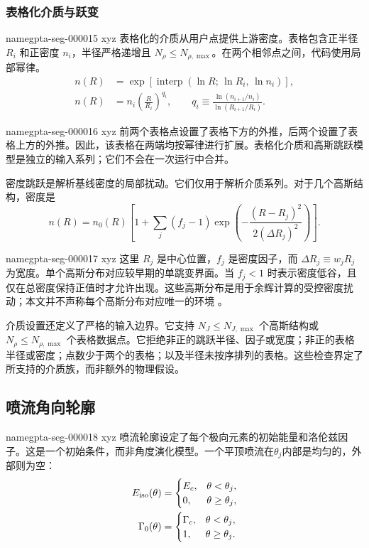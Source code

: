 \documentclass[twocolumn]{aastex702}
\makeatletter
\providecommand{\gptareaderanchor}[1]{\pdfdest name{#1} xyz}%
\providecommand{\gptareaderanchor}[1]{\special{pdf:dest (#1) [ @thispage /XYZ @xpos @ypos null ]}}%
\makeatother
\begin{document}
\subsubsection{表格化介质与跃变}


\gptareaderanchor{gpta-seg-000015}%
表格化的介质从用户点提供上游密度。表格包含正半径 \(R_i\) 和正密度 \(n_i\)，半径严格递增且 \(N_\rho\le N_{\rho,\max}\)。在两个相邻点之间，代码使用局部幂律。
\begin{equation}
\begin{aligned}
n(R) &=
\exp\left[
\operatorname{interp}\left(\ln R;\,\ln R_i,\,\ln n_i\right)
\right],\\
n(R) &=
n_i
\left(\frac{R}{R_i}\right)^{q_i},\qquad
q_i\equiv\frac{\ln(n_{i+1}/n_i)}{\ln(R_{i+1}/R_i)} .
\end{aligned}
\end{equation}

\gptareaderanchor{gpta-seg-000016}%
前两个表格点设置了表格下方的外推，后两个设置了表格上方的外推。因此，该表格在两端均按幂律进行扩展。表格化介质和高斯跳跃模型是独立的输入系列；它们不会在一次运行中合并。

密度跳跃是解析基线密度的局部扰动。它们仅用于解析介质系列。对于几个高斯结构，密度是
\begin{equation}
n(R)=n_0(R)
\left[
1+\sum_j
(f_j-1)
\exp\left(
-\frac{(R-R_j)^2}{2(\Delta R_j)^2}
\right)
\right].
\end{equation}

\gptareaderanchor{gpta-seg-000017}%
这里 \(R_j\) 是中心位置，\(f_j\) 是密度因子，而 \(\Delta R_j\equiv w_jR_j\) 为宽度。单个高斯分布对应较早期的单跳变界面。当 \(f_j<1\) 时表示密度低谷，且仅在总密度保持正值时才允许出现。这些高斯分布是用于余辉计算的受控密度扰动；本文并不声称每个高斯分布对应唯一的环境 \citep{DaiLu2002,NakarGranot2007,UhmZhang2014}。

介质设置还定义了严格的输入边界。它支持 \(N_J\le N_{J,\max}\) 个高斯结构或 \(N_\rho\le N_{\rho,\max}\) 个表格数据点。它拒绝非正的跳跃半径、因子或宽度；非正的表格半径或密度；点数少于两个的表格；以及半径未按序排列的表格。这些检查界定了所支持的介质族，而非额外的物理假设。

\subsection{喷流角向轮廓}


\gptareaderanchor{gpta-seg-000018}%
喷流轮廓设定了每个极向元素的初始能量和洛伦兹因子。这是一个初始条件，而非角度演化模型。一个平顶喷流在\(\theta_j\)内部是均匀的，外部则为空：
\begin{equation}
\begin{aligned}
E_{\rm iso}(\theta) &=
\begin{cases}
E_c, & \theta<\theta_j,\\
0, & \theta\ge\theta_j,
\end{cases}\\
\Gamma_0(\theta) &=
\begin{cases}
\Gamma_c, & \theta<\theta_j,\\
1, & \theta\ge\theta_j .
\end{cases}
\end{aligned}
\end{equation}
\end{document}
